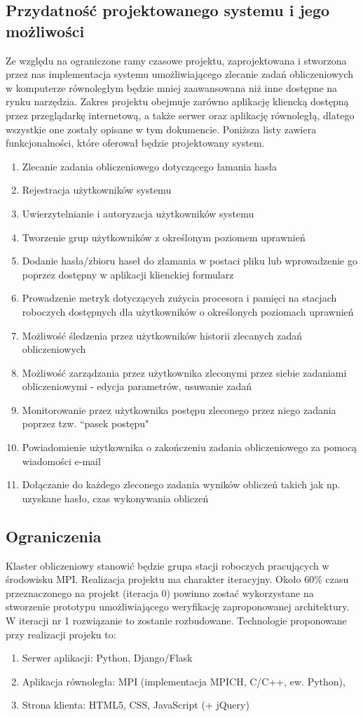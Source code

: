 \documentclass[a4paper,10pt]{article}
\begin{document}
\subsection{Przydatność projektowanego systemu i jego możliwości}
Ze względu na ograniczone ramy czasowe projektu, zaprojektowana i stworzona przez nas implementacja systemu umożliwiającego zlecanie zadań obliczeniowych w komputerze równoległym będzie mniej zaawansowana niż inne dostępne na rynku narzędzia. Zakres projektu obejmuje zarówno aplikację kliencką dostępną przez przeglądarkę internetową, a także serwer oraz aplikację równoległą, dlatego wszystkie one zostały opisane w tym dokumencie. Poniższa listy zawiera funkcjonalności, które oferował będzie projektowany system.
\begin{enumerate}
\item Zlecanie zadania obliczeniowego dotyczącego łamania hasła
\item Rejestracja użytkowników systemu
\item Uwierzytelnianie i autoryzacja użytkowników systemu
\item Tworzenie grup użytkowników z określonym poziomem uprawnień
\item Dodanie hasła/zbioru haseł do złamania w postaci pliku lub wprowadzenie go poprzez dostępny w aplikacji klienckiej formularz
\item Prowadzenie metryk dotyczących zużycia procesora i pamięci na stacjach roboczych dostępnych dla użytkowników o określonych poziomach uprawnień
\item Możliwość śledzenia przez użytkowników historii zlecanych zadań obliczeniowych
\item Możliwość zarządzania przez użytkownika zleconymi przez siebie zadaniami obliczeniowymi - edycja parametrów, usuwanie zadań
\item Monitorowanie przez użytkownika postępu zleconego przez niego zadania poprzez tzw. ``pasek postępu"
\item Powiadomienie użytkownika o zakończeniu zadania obliczeniowego za pomocą wiadomości e-mail
\item Dołączanie do każdego zleconego zadania wyników obliczeń takich jak np. uzyskane hasło, czas wykonywania obliczeń
\end{enumerate}
\subsection{Ograniczenia}
Klaster obliczeniowy stanowić będzie grupa stacji roboczych pracujących w środowisku MPI. Realizacja projektu ma charakter iteracyjny. Około 60\% czasu przeznaczonego na projekt (iteracja 0) powinno zostać wykorzystane na stworzenie prototypu umożliwiającego weryfikację zaproponowanej architektury. W iteracji nr 1 rozwiązanie to zostanie rozbudowane. Technologie proponowane przy realizacji projeku to:
\begin{enumerate}
\item Serwer aplikacji: Python, Django/Flask
\item Aplikacja równoległa: MPI (implementacja MPICH, C/C++, ew. Python),
\item Strona klienta: HTML5, CSS, JavaScript (+ jQuery)
\end{enumerate}
\end{document}
